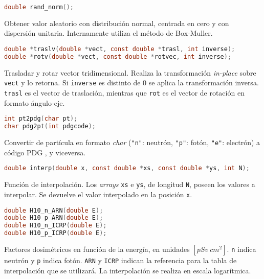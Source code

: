\begin{footnotesize}

\begin{lstlisting}[language=C]
double rand_norm();
\end{lstlisting}
\begin{addmargin}[0.5cm]{0cm}
Obtener valor aleatorio con distribución normal, centrada en cero y con dispersión unitaria. Internamente utiliza el método de Box-Muller.
\end{addmargin}

\begin{lstlisting}[language=C]
double *traslv(double *vect, const double *trasl, int inverse);
double *rotv(double *vect, const double *rotvec, int inverse);
\end{lstlisting}
\begin{addmargin}[0.5cm]{0cm}
Trasladar y rotar vector tridimensional. Realiza la transformación \emph{in-place} sobre \verb|vect| y lo retorna. Si \verb|inverse| es distinto de 0 se aplica la transformación inversa. \verb|trasl| es el vector de traslación, mientras que \verb|rot| es el vector de rotación en formato ángulo-eje.
\end{addmargin}

\begin{lstlisting}[language=C]
int pt2pdg(char pt);
char pdg2pt(int pdgcode);
\end{lstlisting}
\begin{addmargin}[0.5cm]{0cm}
Convertir de partícula en formato \emph{char} (\verb|"n"|: neutrón, \verb|"p"|: fotón, \verb|"e"|: electrón) a código PDG \cite{PDG}, y viceversa.
\end{addmargin}

\begin{lstlisting}[language=C]
double interp(double x, const double *xs, const double *ys, int N);
\end{lstlisting}
\begin{addmargin}[0.5cm]{0cm}
Función de interpolación. Los \emph{arrays} \verb|xs| e \verb|ys|, de longitud \verb|N|, poseen los valores a interpolar. Se devuelve el valor interpolado en la posición \verb|x|.
\end{addmargin}

\begin{lstlisting}[language=C]
double H10_n_ARN(double E);
double H10_p_ARN(double E);
double H10_n_ICRP(double E);
double H10_p_ICRP(double E);
\end{lstlisting}
\begin{addmargin}[0.5cm]{0cm}
Factores dosimétricos en función de la energía, en unidades $[pSv\ cm^2]$. \verb|n| indica neutrón y \verb|p| indica fotón. \verb|ARN| y \verb|ICRP| indican la referencia para la tabla de interpolación que se utilizará. La interpolación se realiza en escala logarítmica.
\end{addmargin}

\end{footnotesize}
